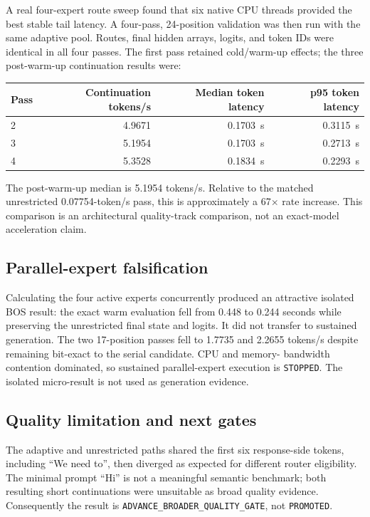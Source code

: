 A real four-expert route sweep found that six native CPU threads provided the
best stable tail latency.  A four-pass, 24-position validation was then run
with the same adaptive pool.  Routes, final hidden arrays, logits, and token IDs
were identical in all four passes.  The first pass retained cold/warm-up
effects; the three post-warm-up continuation results were:

\begin{center}
\begin{tabular}{@{}lrrr@{}}
\toprule
Pass & Continuation tokens/s & Median token latency & p95 token latency \\
\midrule
2 & 4.9671 & 0.1703~s & 0.3115~s \\
3 & 5.1954 & 0.1703~s & 0.2713~s \\
4 & 5.3528 & 0.1834~s & 0.2293~s \\
\bottomrule
\end{tabular}
\end{center}

The post-warm-up median is 5.1954 tokens/s.  Relative to the matched
unrestricted 0.07754-token/s pass, this is approximately a 67$\times$ rate
increase.  This comparison is an architectural quality-track comparison, not
an exact-model acceleration claim.

\subsection{Parallel-expert falsification}

Calculating the four active experts concurrently produced an attractive
isolated BOS result: the exact warm evaluation fell from 0.448 to 0.244 seconds
while preserving the unrestricted final state and logits.  It did not transfer
to sustained generation.  The two 17-position passes fell to 1.7735 and 2.2655
tokens/s despite remaining bit-exact to the serial candidate.  CPU and memory-
bandwidth contention dominated, so sustained parallel-expert execution is
\texttt{STOPPED}.  The isolated micro-result is not used as generation evidence.

\subsection{Quality limitation and next gates}

The adaptive and unrestricted paths shared the first six response-side tokens,
including ``We need to'', then diverged as expected for different router
eligibility.  The minimal prompt ``Hi'' is not a meaningful semantic benchmark;
both resulting short continuations were unsuitable as broad quality evidence.
Consequently the result is \texttt{ADVANCE\_BROADER\_QUALITY\_GATE}, not
\texttt{PROMOTED}.


